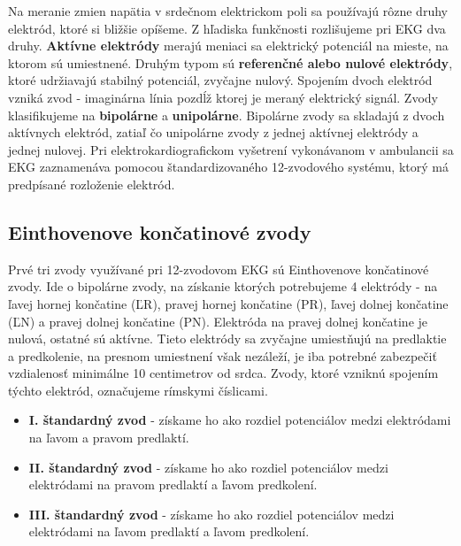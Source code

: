 Na meranie zmien napätia v srdečnom elektrickom poli sa používajú rôzne druhy elektród, ktoré si bližšie opíšeme. Z hľadiska funkčnosti rozlišujeme pri EKG dva druhy. \textbf{Aktívne elektródy} merajú meniaci sa elektrický potenciál na mieste, na ktorom sú umiestnené. Druhým typom sú \textbf{referenčné alebo nulové elektródy}, ktoré udržiavajú stabilný potenciál, zvyčajne nulový. Spojením dvoch elektród vzniká zvod - imaginárna línia pozdĺž ktorej je meraný elektrický signál. Zvody klasifikujeme na \textbf{bipolárne} a \textbf{unipolárne}. Bipolárne zvody sa skladajú z dvoch aktívnych elektród, zatiaľ čo unipolárne zvody z jednej aktívnej elektródy a jednej nulovej. Pri elektrokardiografickom vyšetrení vykonávanom v ambulancii sa EKG zaznamenáva pomocou štandardizovaného 12-zvodového systému, ktorý má predpísané rozloženie elektród.

\subsection{Einthovenove končatinové zvody}

Prvé tri zvody využívané pri 12-zvodovom EKG sú Einthovenove končatinové zvody. Ide o bipolárne zvody, na získanie ktorých potrebujeme 4 elektródy - na ľavej hornej končatine (ĽR), pravej hornej končatine (PR), ľavej dolnej končatine (ĽN) a pravej dolnej končatine (PN). Elektróda na pravej dolnej končatine je nulová, ostatné sú aktívne. Tieto elektródy sa zvyčajne umiestňujú na predlaktie a predkolenie, na presnom umiestnení však nezáleží, je iba potrebné zabezpečiť vzdialenosť minimálne 10 centimetrov od srdca.\cite{garcia201512} Zvody, ktoré vzniknú spojením týchto elektród, označujeme rímskymi číslicami.

\begin{itemize}
    \item \textbf{I. štandardný zvod} - získame ho ako rozdiel potenciálov medzi elektródami na ľavom a pravom predlaktí.
    \item \textbf{II. štandardný zvod} - 
    získame ho ako rozdiel potenciálov medzi elektródami na pravom predlaktí a ľavom predkolení.
    \item \textbf{III. štandardný zvod} - 
     získame ho ako rozdiel potenciálov medzi elektródami na ľavom predlaktí a ľavom predkolení.\cite{Bada2010}
\end{itemize}


